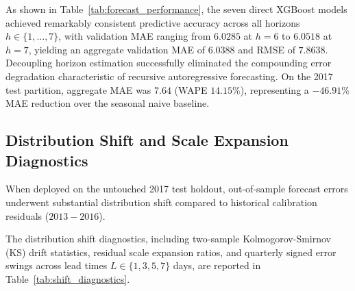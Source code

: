 As shown in Table~\ref{tab:forecast_performance}, the seven direct XGBoost models achieved remarkably consistent predictive accuracy across all horizons $h \in \{1,\dots,7\}$, with validation MAE ranging from $6.0285$ at $h=6$ to $6.0518$ at $h=7$, yielding an aggregate validation MAE of $6.0388$ and RMSE of $7.8638$. Decoupling horizon estimation successfully eliminated the compounding error degradation characteristic of recursive autoregressive forecasting. On the 2017 test partition, aggregate MAE was $7.64$ (WAPE $14.15\%$), representing a $-46.91\%$ MAE reduction over the seasonal naive baseline.

\subsection{Distribution Shift and Scale Expansion Diagnostics}
When deployed on the untouched 2017 test holdout, out-of-sample forecast errors underwent substantial distribution shift compared to historical calibration residuals ($2013-2016$). 

The distribution shift diagnostics, including two-sample Kolmogorov-Smirnov (KS) drift statistics, residual scale expansion ratios, and quarterly signed error swings across lead times $L \in \{1, 3, 5, 7\}$ days, are reported in Table~\ref{tab:shift_diagnostics}.

\begin{table}[htbp]
\centering
\caption{Two-Sample Distribution Shift Diagnostics Between Historical Calibration and 2017 Test Residuals}
\label{tab:shift_diagnostics}
\small
{}
\end{table}

